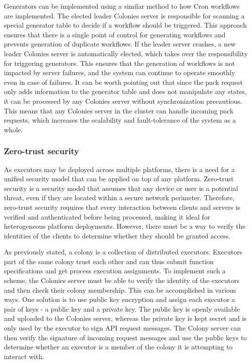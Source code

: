 \documentclass{article}
\begin{document}
Generators can be implemented using a similar method to how Cron workflows are implemented. The elected leader Colonies server is responsible for scanning a special generator table to decide if a workflow should be triggered. This approach ensures that there is a single point of control for generating workflows and prevents generation of duplicate workflows. If the leader server crashes, a new leader Colonies server is automatically elected, which takes over the responsibility for triggering generators. This ensures that the generation of workflows is not impacted by server failures, and the system can continue to operate smoothly even in case of failures. It can be worth pointing out that since the pack request only adds information to the generator table and does not manipulate any states, it can be processed by any Colonies server without synchronization precautious. This means that any Colonies server in the cluster can handle incoming pack requests, which increases the scalability and fault-tolerance of the system as a whole.

\subsubsection{Zero-trust security}
\label{zerotrustsecurity}
As executors may be deployed across multiple platforms, there is a need for a unified security model that can be applied on top of any platform. Zero-trust security \cite{zerotrust} is a security model that assumes that any device or user is a potential threat, even if they are located within a secure network perimeter. Therefore, zero-trust security requires that every interaction between clients and servers is verified and authenticated before being processed, making it ideal for heterogeneous platform deployments. However, there must be a way to verify the identities of the clients to determine whether they should be granted access.

As previously stated, a colony is a collection of distributed executors. Executors part of the same colony trust each other and can thus submit function specifications and get process execution assignments. To implement such a scheme, the Colonies server must be able to verify the identity of the executors and then check their colony membership. This can be accomplished in various ways. One solution is to use public key encryption and assign each executor a pair of keys - a public key and a private key. The public key is openly available and uploaded to the Colonies server, whereas the private key is kept secret and is only used by the executor to sign API request messages. The Colony server can then verify the signature of incoming request messages and use the public keys to determine whether an executor is a member of the colony it is attempting to interact with.
\end{document}
